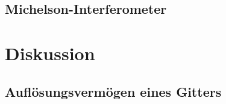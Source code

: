 \documentclass[12pt,a4paper]{article}
\begin{document}
\begin{multicols}{2}

\subsection{Michelson-Interferometer}


\section{Diskussion}
\subsection{Auflösungsvermögen eines Gitters}


\end{multicols}
\end{document}
